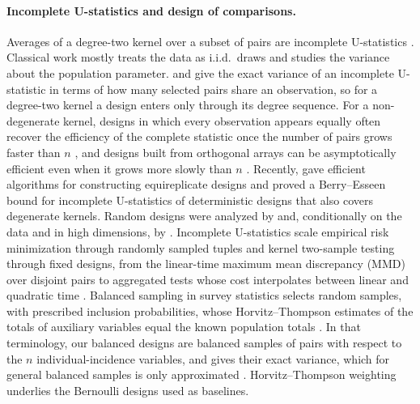 \paragraph{Incomplete U-statistics and design of comparisons.}
Averages of a degree-two kernel over a subset of pairs are incomplete
U-statistics \citep{blom1976some}. Classical work mostly treats the data as i.i.d.\
draws and studies the variance about the population parameter.
\citet{blom1976some} and \citet{lee1982incomplete} give the exact
variance of an incomplete U\nobreakdash-statistic in terms of how many selected
pairs share an observation, so for a degree-two kernel a design enters only
through its degree sequence. For a non-degenerate kernel, designs in which every
observation appears equally often recover the efficiency of the complete
statistic once the number of pairs grows faster than $n$
\citep{brown1978reduced,lee1982incomplete,lee1990ustatistics}, and designs
built from orthogonal arrays can be asymptotically efficient even when it grows
more slowly than $n$ \citep{kong2021design}. Recently,
\citet{miglioli2025incomplete} gave efficient algorithms for constructing
equireplicate designs and proved a Berry--Esseen bound for incomplete
U-statistics of deterministic designs that also covers degenerate kernels. Random designs were analyzed by
\citet{janson1984asymptotic} and, conditionally on the data and in high dimensions, by
\citet{chen2019randomized}. Incomplete
U-statistics scale empirical risk minimization through randomly sampled tuples
\citep{clemencon2016scaling} and kernel two-sample testing through fixed
designs, from the linear-time maximum mean discrepancy (MMD) over disjoint pairs \citep{gretton2012kernel}
to aggregated tests whose cost interpolates between linear and quadratic time
\citep{schrab2022efficient}.
Balanced sampling in survey statistics selects random samples, with
prescribed inclusion probabilities, whose Horvitz\nobreakdash--Thompson
estimates of the totals of auxiliary variables equal the known population
totals \citep{deville2004efficient}. In that
terminology, our balanced designs are balanced samples of pairs with respect to
the $n$ individual-incidence variables, and \Cref{thm:balanced} gives their exact
variance, which for general balanced samples is only approximated
\citep{deville2005variance}. Horvitz\nobreakdash--Thompson weighting
\citep{horvitz1952generalization} underlies the Bernoulli designs used as
baselines.

